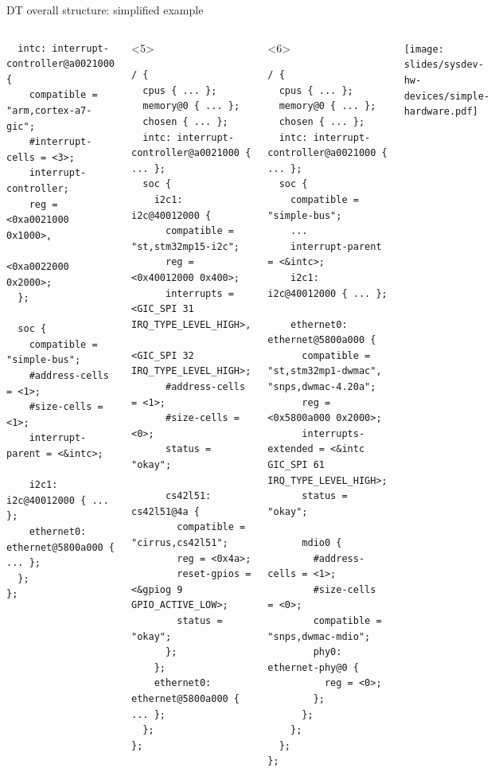 \begin{frame}[fragile]{DT overall structure: simplified example}
\begin{columns}
\begin{onlyenv}
\begin{block}{}
\begin{verbatim}
  intc: interrupt-controller@a0021000 {
    compatible = "arm,cortex-a7-gic";
    #interrupt-cells = <3>;
    interrupt-controller;
    reg = <0xa0021000 0x1000>,
          <0xa0022000 0x2000>;
  };

  soc {
    compatible = "simple-bus";
    #address-cells = <1>;
    #size-cells = <1>;
    interrupt-parent = <&intc>;

    i2c1: i2c@40012000 { ... };
    ethernet0: ethernet@5800a000 { ... };
  };
};
\end{verbatim}
      \end{block}
    \end{onlyenv}
    \begin{onlyenv}<5>
      \begin{block}{}
\begin{verbatim}
/ {
  cpus { ... };
  memory@0 { ... };
  chosen { ... };
  intc: interrupt-controller@a0021000 { ... };
  soc {
    i2c1: i2c@40012000 {
      compatible = "st,stm32mp15-i2c";
      reg = <0x40012000 0x400>;
      interrupts = <GIC_SPI 31 IRQ_TYPE_LEVEL_HIGH>,
                   <GIC_SPI 32 IRQ_TYPE_LEVEL_HIGH>;
      #address-cells = <1>;
      #size-cells = <0>;
      status = "okay";

      cs42l51: cs42l51@4a {
        compatible = "cirrus,cs42l51";
        reg = <0x4a>;
        reset-gpios = <&gpiog 9 GPIO_ACTIVE_LOW>;
        status = "okay";
      };
    };
    ethernet0: ethernet@5800a000 { ... };
  };
};
\end{verbatim}
      \end{block}
    \end{onlyenv}
    \begin{onlyenv}<6>
      \begin{block}{}
\begin{verbatim}
/ {
  cpus { ... };
  memory@0 { ... };
  chosen { ... };
  intc: interrupt-controller@a0021000 { ... };
  soc {
    compatible = "simple-bus";
    ...
    interrupt-parent = <&intc>;
    i2c1: i2c@40012000 { ... };

    ethernet0: ethernet@5800a000 {
      compatible = "st,stm32mp1-dwmac", "snps,dwmac-4.20a";
      reg = <0x5800a000 0x2000>;
      interrupts-extended = <&intc GIC_SPI 61 IRQ_TYPE_LEVEL_HIGH>;
      status = "okay";

      mdio0 {
        #address-cells = <1>;
        #size-cells = <0>;
        compatible = "snps,dwmac-mdio";
        phy0: ethernet-phy@0 {
          reg = <0>;
        };
      };
    };
  };
};
\end{verbatim}
      \end{block}
    \end{onlyenv}
    \texttt{[image: slides/sysdev-hw-devices/simple-hardware.pdf]}
  \end{columns}
\end{frame}

